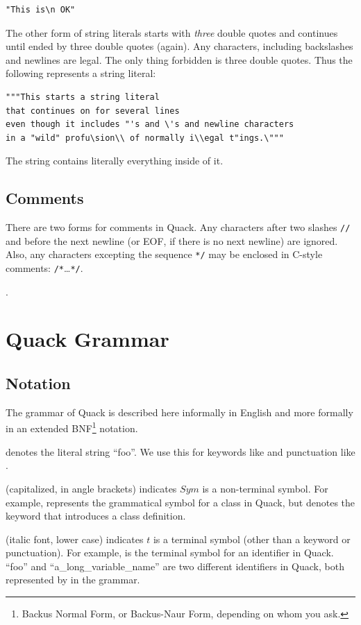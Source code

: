 \documentclass[11pt]{article}
\begin{document}
\begin{verbatim}
"This is\n OK"
\end{verbatim}


The other form of string literals starts with \emph{three} double
quotes and continues until ended by three double quotes (again).
Any characters, including backslashes and newlines are legal.
The only thing forbidden is three double quotes.  Thus the following
represents a string literal:
\begin{verbatim}
"""This starts a string literal
that continues on for several lines
even though it includes "'s and \'s and newline characters
in a "wild" profu\sion\\ of normally i\\egal t"ings.\"""
\end{verbatim}
The string contains literally everything inside of it. 

\subsection{Comments}

There are two forms for comments in Quack.  Any characters after two
slashes \verb"//" and before the next newline (or EOF, if there is no next
newline) are ignored. Also, any characters excepting the sequence
\verb|*/| may be enclosed in C-style comments: \verb|/*|\ldots\verb|*/|.

. 

\section{Quack Grammar}

\subsection{Notation}

The grammar of Quack is described here informally in English and more
formally in an extended BNF\footnote{Backus Normal Form, or
  Backus-Naur Form, depending on whom you ask.} notation. 

\begin{description}
\item[] denotes the literal string  ``foo''.
  We use this for keywords like  and punctuation 
  like \literal{:}.  
\item[] (capitalized, in angle brackets) indicates $Sym$ is a non-terminal symbol. 
  For example,  represents the grammatical symbol
  for a class in Quack, but  denotes the keyword that 
  introduces a class definition. 
\item{} (italic font, lower case) indicates $t$ is a terminal symbol (other than 
  a keyword or punctuation).  For example,  
  is the terminal symbol for an identifier in Quack.  ``foo'' and 
  ``a\_long\_variable\_name'' are two different identifiers in Quack,
  both represented by  in the grammar.
\end{description}
\end{document}
